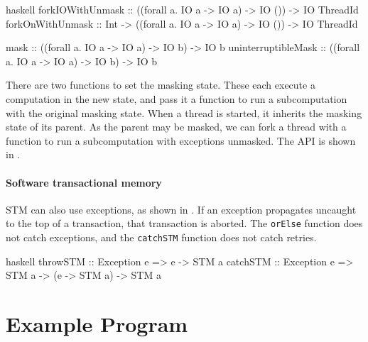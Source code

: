 \begin{listing}
\centering
\begin{cminted}{haskell}
forkIOWithUnmask    :: ((forall a. IO a -> IO a) -> IO ()) -> IO ThreadId
forkOnWithUnmask    :: Int -> ((forall a. IO a -> IO a) -> IO ()) -> IO ThreadId

mask                :: ((forall a. IO a -> IO a) -> IO b) -> IO b
uninterruptibleMask :: ((forall a. IO a -> IO a) -> IO b) -> IO b
\end{cminted}
\caption{Masking exceptions in Haskell.}\label{lst:excm_haskell}
\end{listing}

There are two functions to set the masking state.  These each execute
a computation in the new state, and pass it a function to run a
subcomputation with the original masking state.  When a thread is
started, it inherits the masking state of its parent.  As the parent
may be masked, we can fork a thread with a function to run a
subcomputation with exceptions unmasked.  The API is shown in
.

\paragraph{Software transactional memory}
STM can also use exceptions, as shown in .
If an exception propagates uncaught to the top of a transaction, that
transaction is aborted.  The \verb|orElse| function does not catch
exceptions, and the \verb|catchSTM| function does not catch retries.

\begin{listing}
\centering
\begin{cminted}{haskell}
throwSTM :: Exception e => e -> STM a
catchSTM :: Exception e => STM a -> (e -> STM a) -> STM a
\end{cminted}
\caption{STM exceptions in Haskell.}\label{lst:excstm_haskell}
\end{listing}

\section{Example Program}
\label{sec:concurrent_haskell-example}

\begin{listing}
\centering
{}
\caption[A simple alarm program.]{A simple alarm program.  Adapted from~\cite{marlow2013}.}\label{lst:ch_ex1}
\end{listing}

